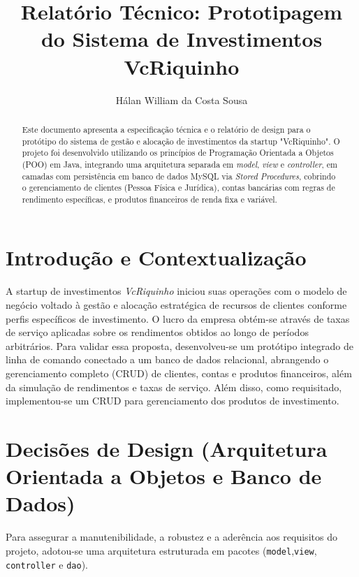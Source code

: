 \documentclass[12pt, a4paper]{article}
\title{Relatório Técnico: Prototipagem do Sistema de Investimentos VcRiquinho}
\author{Hálan William da Costa Sousa}
\date{}
\begin{document}
	
	\maketitle
	
	\begin{abstract}
		Este documento apresenta a especificação técnica e o relatório de design para o protótipo do sistema de gestão e alocação de investimentos da startup "VcRiquinho". O projeto foi desenvolvido utilizando os princípios de Programação Orientada a Objetos (POO) em Java, integrando uma arquitetura separada em \textit{model}, \textit{view} e \textit{controller}, em camadas com persistência em banco de dados MySQL via \textit{Stored Procedures}, cobrindo o gerenciamento de clientes (Pessoa Física e Jurídica), contas bancárias com regras de rendimento específicas, e produtos financeiros de renda fixa e variável.
	\end{abstract}
	
	\section{Introdução e Contextualização}
	A startup de investimentos \textit{VcRiquinho} iniciou suas operações com o modelo de negócio voltado à gestão e alocação estratégica de recursos de clientes conforme perfis específicos de investimento. O lucro da empresa obtém-se através de taxas de serviço aplicadas sobre os rendimentos obtidos ao longo de períodos arbitrários. Para validar essa proposta, desenvolveu-se um protótipo integrado de linha de comando conectado a um banco de dados relacional, abrangendo o gerenciamento completo (CRUD) de clientes, contas e produtos financeiros, além da simulação de rendimentos e taxas de serviço. Além disso, como requisitado, implementou-se um CRUD para gerenciamento dos produtos de investimento.
	
	\section{Decisões de Design (Arquitetura Orientada a Objetos e Banco de Dados)}
	Para assegurar a manutenibilidade, a robustez e a aderência aos requisitos do projeto, adotou-se uma arquitetura estruturada em pacotes (\texttt{model},\texttt{view}, \texttt{controller} e \texttt{dao}).
	
\end{document}
